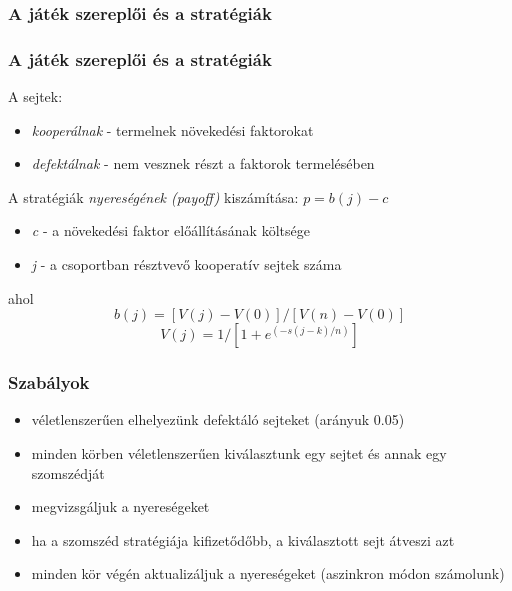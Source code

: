 \subsubsection{A játék szereplői és a stratégiák}
\begin{frame}
	\frametitle{A játék szereplői és a stratégiák}
	A sejtek:
	\begin{itemize}
		\item \textit{kooperálnak} - termelnek növekedési faktorokat
		\item \textit{defektálnak} - nem vesznek részt a faktorok termelésében
	\end{itemize}
	A stratégiák \textit{nyereségének (payoff)} kiszámítása: \(p = b(j) - c\)
	\begin{itemize}
		\item \textit{c} - a növekedési faktor előállításának költsége
		\item \textit{j} - a csoportban résztvevő kooperatív sejtek száma
	\end{itemize}
	ahol 
	\begin{equation}
		b(j) = [V(j) - V(0)]/[V(n) - V(0)]
	\end{equation}
	\begin{equation}
		\label{eq:payoffGradient}
		V(j) = 1/[1 + e^{(-s(j-k)/n)}]
	\end{equation}
\end{frame}

\begin{frame}
	\frametitle{Szabályok}
	\begin{itemize}
		\item véletlenszerűen elhelyezünk defektáló sejteket (arányuk 0.05)
		\item minden körben véletlenszerűen kiválasztunk egy sejtet és annak egy szomszédját 
		\item megvizsgáljuk a nyereségeket
		\item ha a szomszéd stratégiája kifizetődőbb, a kiválasztott sejt átveszi azt
		\item minden kör végén aktualizáljuk a nyereségeket (aszinkron módon számolunk)
	\end{itemize}
\end{frame}


